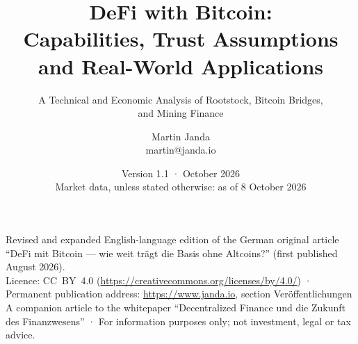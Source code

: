 \documentclass[12pt,a4paper,oneside]{scrartcl}
\title{DeFi with Bitcoin:\\ Capabilities, Trust Assumptions\\ and Real-World Applications}
\subtitle{A Technical and Economic Analysis of Rootstock, Bitcoin Bridges,\\ and Mining Finance}
\author{Martin Janda\\\normalsize martin@janda.io}
\date{Version 1.1 · October 2026 \\ \footnotesize Market data, unless stated otherwise: as of 8 October 2026}
\begin{document}
\singlespacing

\maketitle
\vspace*{-2em}

\begin{center}\footnotesize
  Revised and expanded English-language edition of the German original article
  \enquote{DeFi mit Bitcoin --- wie weit trägt die Basis ohne Altcoins?}
  (first published August 2026). \\
  Licence: CC~BY~4.0 (\url{https://creativecommons.org/licenses/by/4.0/}) ·
  Permanent publication address: \url{https://www.janda.io}, section Veröffentlichungen \\
  A companion article to the whitepaper \enquote{Decentralized Finance und
  die Zukunft des Finanzwesens} ·
  For information purposes only; not investment, legal or tax advice.
\end{center}

\let\origsection\section
\renewcommand{\section}{\onehalfspacing\global\let\section\origsection\section}



\printbibliography
\end{document}
